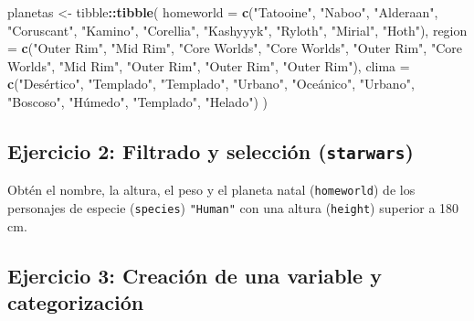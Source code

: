 \documentclass[
]{book}
\newenvironment{Shaded}{\begin{snugshade}}{\end{snugshade}}
\newcommand{\AttributeTok}[1]{\textcolor[rgb]{0.13,0.29,0.53}{#1}}
\newcommand{\FunctionTok}[1]{\textcolor[rgb]{0.13,0.29,0.53}{\textbf{#1}}}
\newcommand{\NormalTok}[1]{#1}
\newcommand{\OtherTok}[1]{\textcolor[rgb]{0.56,0.35,0.01}{#1}}
\newcommand{\SpecialCharTok}[1]{\textcolor[rgb]{0.81,0.36,0.00}{\textbf{#1}}}
\newcommand{\StringTok}[1]{\textcolor[rgb]{0.31,0.60,0.02}{#1}}
\theoremstyle{break}
\theoremstyle{nonumberplain}
\begin{document}
\begin{Shaded}
\begin{Highlighting}[]
\NormalTok{planetas }\OtherTok{\textless{}{-}}\NormalTok{ tibble}\SpecialCharTok{::}\FunctionTok{tibble}\NormalTok{(}
  \AttributeTok{homeworld =} \FunctionTok{c}\NormalTok{(}\StringTok{"Tatooine"}\NormalTok{, }\StringTok{"Naboo"}\NormalTok{, }\StringTok{"Alderaan"}\NormalTok{, }\StringTok{"Coruscant"}\NormalTok{, }\StringTok{"Kamino"}\NormalTok{,}
                \StringTok{"Corellia"}\NormalTok{, }\StringTok{"Kashyyyk"}\NormalTok{, }\StringTok{"Ryloth"}\NormalTok{, }\StringTok{"Mirial"}\NormalTok{, }\StringTok{"Hoth"}\NormalTok{),}
  \AttributeTok{region    =} \FunctionTok{c}\NormalTok{(}\StringTok{"Outer Rim"}\NormalTok{, }\StringTok{"Mid Rim"}\NormalTok{, }\StringTok{"Core Worlds"}\NormalTok{, }\StringTok{"Core Worlds"}\NormalTok{, }\StringTok{"Outer Rim"}\NormalTok{,}
                \StringTok{"Core Worlds"}\NormalTok{, }\StringTok{"Mid Rim"}\NormalTok{, }\StringTok{"Outer Rim"}\NormalTok{, }\StringTok{"Outer Rim"}\NormalTok{, }\StringTok{"Outer Rim"}\NormalTok{),}
  \AttributeTok{clima     =} \FunctionTok{c}\NormalTok{(}\StringTok{"Desértico"}\NormalTok{, }\StringTok{"Templado"}\NormalTok{, }\StringTok{"Templado"}\NormalTok{, }\StringTok{"Urbano"}\NormalTok{, }\StringTok{"Oceánico"}\NormalTok{,}
                \StringTok{"Urbano"}\NormalTok{, }\StringTok{"Boscoso"}\NormalTok{, }\StringTok{"Húmedo"}\NormalTok{, }\StringTok{"Templado"}\NormalTok{, }\StringTok{"Helado"}\NormalTok{)}
\NormalTok{)}
\end{Highlighting}
\end{Shaded}

\subsection{\texorpdfstring{Ejercicio 2: Filtrado y selección (\texttt{starwars})}{Ejercicio 2: Filtrado y selección (starwars)}}\label{ejercicio-2-filtrado-y-selecciuxf3n-starwars-1}

Obtén el nombre, la altura, el peso y el planeta natal (\texttt{homeworld}) de los
personajes de especie (\texttt{species}) \texttt{"Human"} con una altura (\texttt{height})
superior a 180 cm.

\subsection{Ejercicio 3: Creación de una variable y categorización}\label{ejercicio-3-creaciuxf3n-de-una-variable-y-categorizaciuxf3n-1}
\end{document}
